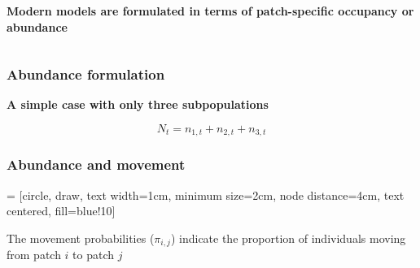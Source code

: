 \documentclass[color=usenames,dvipsnames]{beamer}\usepackage[]{graphicx}\usepackage[]{color}
\begin{document}
\begin{frame}
\begin{columns}
\begin{column}{0.7\textwidth}
      \pause
      \vspace{1cm}
      {\bf Modern models are formulated in terms of patch-specific
        \alert{occupancy} or \alert{abundance} \par}
    \end{column}
  \end{columns}
\end{frame}







\begin{frame}
  \frametitle{Abundance formulation}
  \Large
  {\centering \bf A simple case with only three subpopulations \par}
  \[
    N_t = n_{1,t} + n_{2,t} + n_{3,t}
  \]
\end{frame}





\begin{frame}
  \frametitle{Abundance and movement}
   = [circle, draw, text width=1cm, minimum size=2cm,
    node distance=4cm, text centered, fill=blue!10]
    \begin{center}
    \end{center}
    The movement probabilities ($\pi_{i,j}$) indicate the proportion of
    individuals moving from patch $i$ to patch $j$
\end{frame}
\end{document}
